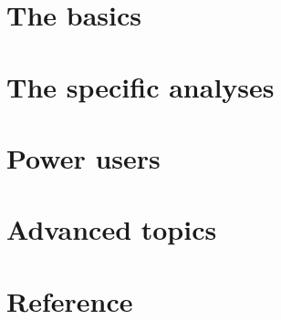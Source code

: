 \documentclass[a4paper, 11pt, twoside, openright]{book}
\newenvironment{spacedpara}{\setlength{\parindent}{0pt} \setlength{\parskip}{2ex plus 0.5ex minus 0.2ex}}{}
\begin{document}

\mainmatter
\begin{spacedpara}



\part{The basics}





\part{The specific analyses}









\part{Power users}


\part{Advanced topics}




\part{Reference}





\end{spacedpara}









\end{document}

